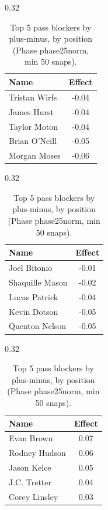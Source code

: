 \begin{table}[h!]
\centering
\begin{subtable}{0.32\textwidth}
\centering
\footnotesize
\begin{tabular}{lc}
\toprule
Name & Effect \\
\midrule
Tristan Wirfs & -0.04 \\
James Hurst & -0.04 \\
Taylor Moton & -0.04 \\
Brian O'Neill & -0.05 \\
Morgan Moses & -0.06 \\
\bottomrule
\end{tabular}
\caption{T}
\end{subtable}
\hfill
\begin{subtable}{0.32\textwidth}
\centering
\footnotesize
\begin{tabular}{lc}
\toprule
Name & Effect \\
\midrule
Joel Bitonio & -0.01 \\
Shaquille Mason & -0.02 \\
Lucas Patrick & -0.04 \\
Kevin Dotson & -0.05 \\
Quenton Nelson & -0.05 \\
\bottomrule
\end{tabular}
\caption{G}
\end{subtable}
\hfill
\begin{subtable}{0.32\textwidth}
\centering
\footnotesize
\begin{tabular}{lc}
\toprule
Name & Effect \\
\midrule
Evan Brown & 0.07 \\
Rodney Hudson & 0.06 \\
Jason Kelce & 0.05 \\
J.C. Tretter & 0.04 \\
Corey Linsley & 0.03 \\
\bottomrule
\end{tabular}
\caption{C}
\end{subtable}
\caption{Top 5 pass blockers by plus-minus, by position (Phase phase25norm, min 50 snaps).}
\label{tab:blocker_pm_phase25norm_top}
\end{table}

